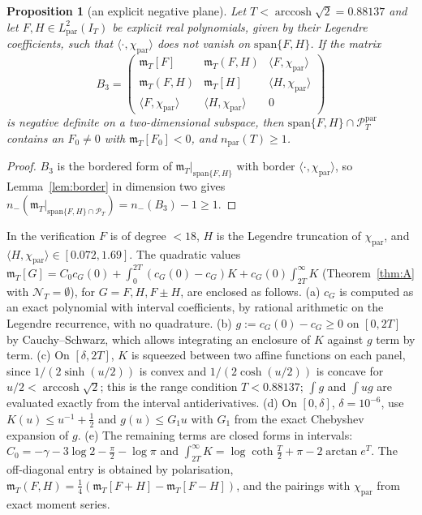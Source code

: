 \documentclass[11pt]{amsart}
\newtheorem{proposition}[theorem]{Proposition}
\theoremstyle{definition}
\theoremstyle{remark}
\newcommand{\PT}{\mathcal P_T}
\newcommand{\IT}{I_T}
\newcommand{\NT}{\mathcal N_T}
\newcommand{\mT}{\mathfrak m_T}
\begin{document}
\begin{proposition}[an explicit negative plane]\label{prop:negplane}
Let $T<\operatorname{arccosh}\sqrt2=0.88137$ and let $F,H\in L^2_{\mathrm{par}}(\IT)$ be
explicit real polynomials, given by their Legendre coefficients, such that $\langle\cdot,\chi_{\mathrm{par}}\rangle$
does not vanish on $\mathrm{span}\{F,H\}$. If the matrix
\[
B_3=\begin{pmatrix}\mT[F]&\mT(F,H)&\langle F,\chi_{\mathrm{par}}\rangle\\
\mT(F,H)&\mT[H]&\langle H,\chi_{\mathrm{par}}\rangle\\
\langle F,\chi_{\mathrm{par}}\rangle&\langle H,\chi_{\mathrm{par}}\rangle&0\end{pmatrix}
\]
is negative definite on a two-dimensional subspace, then $\mathrm{span}\{F,H\}\cap\PT^{\mathrm{par}}$
contains an $F_0\ne0$ with $\mT[F_0]<0$, and $n_{\mathrm{par}}(T)\ge1$.
\end{proposition}
\begin{proof}
$B_3$ is the bordered form of $\mT|_{\mathrm{span}\{F,H\}}$ with border $\langle\cdot,\chi_{\mathrm{par}}\rangle$,
so Lemma~\ref{lem:border} in dimension two gives
$n_-(\mT|_{\mathrm{span}\{F,H\}\cap\PT})=n_-(B_3)-1\ge1$.
\end{proof}
In the verification $F$ is of degree $<18$, $H$ is the Legendre truncation of
$\chi_{\mathrm{par}}$, and $\langle H,\chi_{\mathrm{par}}\rangle\in[0.072,1.69]$. The quadratic values
$\mT[G]=C_0c_G(0)+\int_0^{2T}(c_G(0)-c_G)K+c_G(0)\int_{2T}^\infty K$ (Theorem~\ref{thm:A} with
$\NT=\emptyset$), for $G=F,H,F\pm H$, are enclosed as follows. (a) $c_G$ is computed as an exact polynomial with interval
coefficients, by rational arithmetic on the Legendre recurrence, with no quadrature. (b) $g:=c_G(0)-c_G\ge0$ on
$[0,2T]$ by Cauchy--Schwarz, which allows integrating an enclosure of $K$ against $g$ term by term. (c) On
$[\delta,2T]$, $K$ is squeezed between two affine functions on each panel, since $1/(2\sinh(u/2))$ is convex
and $1/(2\cosh(u/2))$ is concave for $u/2<\operatorname{arccosh}\sqrt2$; this is the range condition
$T<0.88137$; $\int g$ and $\int ug$ are evaluated exactly from the interval antiderivatives. (d) On
$[0,\delta]$, $\delta=10^{-6}$, use $K(u)\le u^{-1}+\frac12$ and $g(u)\le G_1u$ with $G_1$ from the exact
Chebyshev expansion of $g$. (e) The remaining terms are closed forms in intervals:
$C_0=-\gamma-3\log2-\frac\pi2-\log\pi$ and $\int_{2T}^\infty K=\log\coth\frac T2+\pi-2\arctan e^{T}$. The
off-diagonal entry is obtained by polarisation, $\mT(F,H)=\frac14(\mT[F+H]-\mT[F-H])$, and the
pairings with $\chi_{\mathrm{par}}$ from exact moment series.
\end{document}
